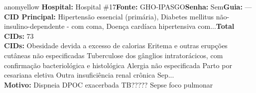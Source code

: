 \documentclass[a4paper,10pt]{article}
\begin{document}
\begin{anomalycard}[Interna\c{c}\~{a}o \#50 | Pac. \#96 | MODERADO (z=2.03) | LOS: 19d | 04/03/2026\,$\to$\,—]{anomyellow}
\textbf{Hospital:} Hospital \#17\quad \textbf{Fonte:} GHO-IPASGO\quad \textbf{Senha:} Sem\quad \textbf{Guia:} ---\\

\textbf{CID Principal:} {\small Hipertensão essencial (primária), Diabetes mellitus não-insulino-dependente - com coma, Doença cardíaca hipertensiva com...}\quad\textbf{Total CIDs:} 73\\

\textbf{CIDs:} {\scriptsize Obesidade devida a excesso de calorias \textbar{} Eritema e outras erupções cutâneas não especificadas \textbar{} Tuberculose dos gânglios intratorácicos, com confirmação bacteriológica e histológica \textbar{} Alergia não especificada \textbar{} Parto por cesariana eletiva \textbar{} Outra insuficiência renal crônica \textbar{} Sep...}\\

\textbf{Motivo:} {\scriptsize Dispneia DPOC exacerbada  TB????? Sepse foco pulmonar}\\




\end{anomalycard}
\end{document}
